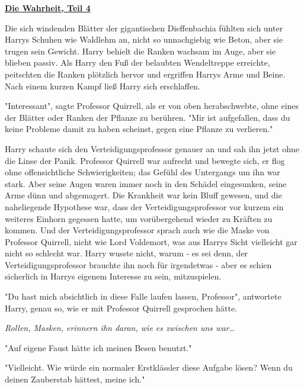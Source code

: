 

\hypertarget{die-wahrheit-teil-4}{%

\textbf{\uline{Die Wahrheit, Teil 4}}

Die sich windenden Blätter der gigantischen Dieffenbachia fühlten sich unter Harrys Schuhen wie Waldlehm an, nicht so unnachgiebig wie Beton, aber sie trugen sein Gewicht. Harry behielt die Ranken wachsam im Auge, aber sie blieben passiv. Als Harry den Fuß der belaubten Wendeltreppe erreichte, peitschten die Ranken plötzlich hervor und ergriffen Harrys Arme und Beine. Nach einem kurzen Kampf ließ Harry sich erschlaffen.

"Interessant", sagte Professor Quirrell, als er von oben herabschwebte, ohne eines der Blätter oder Ranken der Pflanze zu berühren. "Mir ist aufgefallen, dass du keine Probleme damit zu haben scheinst, gegen eine Pflanze zu verlieren."

Harry schaute sich den Verteidigungsprofessor genauer an und sah ihn jetzt ohne die Linse der Panik. Professor Quirrell war aufrecht und bewegte sich, er flog ohne offensichtliche Schwierigkeiten; das Gefühl des Untergangs um ihn war stark. Aber seine Augen waren immer noch in den Schädel eingesunken, seine Arme dünn und abgemagert. Die Krankheit war kein Bluff gewesen, und die naheliegende Hypothese war, dass der Verteidigungsprofessor vor kurzem ein weiteres Einhorn gegessen hatte, um vorübergehend wieder zu Kräften zu kommen. Und der Verteidigungsprofessor sprach auch wie die Maske von Professor Quirrell, nicht wie Lord Voldemort, was aus Harrys Sicht vielleicht gar nicht so schlecht war. Harry wusste nicht, warum - es sei denn, der Verteidigungsprofessor brauchte ihn noch für irgendetwas - aber es schien sicherlich in Harrys eigenem Interesse zu sein, mitzuspielen.

"Du hast mich absichtlich in diese Falle laufen lassen, Professor", antwortete Harry, genau so, wie er mit Professor Quirrell gesprochen hätte.

\emph{Rollen, Masken, erinnern ihn daran, wie es zwischen uns war…}

"Auf eigene Faust hätte ich meinen Besen benutzt."

"Vielleicht. Wie würde ein normaler Erstklässler diese Aufgabe lösen? Wenn du deinen Zauberstab hättest, meine ich."

}
